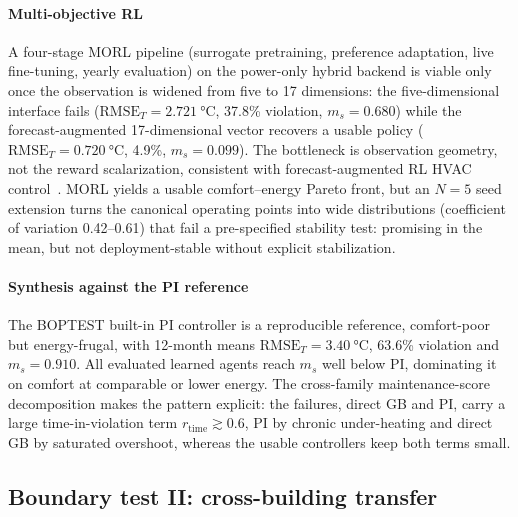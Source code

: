 \documentclass[energies,article,submit,moreauthors]{Definitions/mdpi}
\newcommand{\RMSE}{\ensuremath{\mathrm{RMSE}}}
\newcommand{\ms}{\ensuremath{m_s}}
\begin{document}
\paragraph{Multi-objective RL}
A four-stage MORL pipeline (surrogate pretraining, preference adaptation, live fine-tuning, yearly
evaluation) on the power-only hybrid backend is viable only once the observation is widened from
five to 17 dimensions: the five-dimensional interface fails
($\RMSE_T=\SI{2.721}{\celsius}$, 37.8\% violation, $\ms=0.680$) while the forecast-augmented
17-dimensional vector recovers a usable policy ($\RMSE_T=\SI{0.720}{\celsius}$, 4.9\%,
$\ms=0.099$). The bottleneck is observation geometry, not the reward scalarization, consistent with
forecast-augmented RL HVAC control~\cite{Gao2024Predictive}. MORL yields a usable comfort--energy
Pareto front, but an $N=5$ seed extension turns the canonical operating points into wide
distributions (coefficient of variation 0.42--0.61) that fail a pre-specified stability test:
promising in the mean, but not deployment-stable without explicit stabilization.

\paragraph{Synthesis against the PI reference}
The BOPTEST built-in PI controller is a reproducible reference, comfort-poor but energy-frugal, with
12-month means $\RMSE_T=\SI{3.40}{\celsius}$, 63.6\% violation and $\ms=0.910$. All evaluated
learned agents reach \ms{} well below PI, dominating it on comfort at comparable or lower energy.
The cross-family maintenance-score decomposition makes the pattern explicit: the failures, direct GB
and PI, carry a large time-in-violation term $r_{\mathrm{time}}\gtrsim0.6$, PI by chronic
under-heating and direct GB by saturated overshoot, whereas the usable controllers keep both terms
small.

\subsection{Boundary test II: cross-building transfer}\label{sec:transfer}
\end{document}

